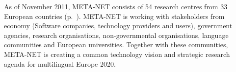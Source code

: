 \begin{Parallel}[c]{78mm}{78mm}
{As of November 2011, META-NET consists of 54 research centres from 33
European countries (p.~\pageref{metanetmembers}). META-NET is working
with stakeholders from economy (Software companies, technology
providers and users), government agencies, research organisations,
non-governmental organisations, language communities and European
universities. Together with these communities, META-NET is creating a
common technology vision and strategic research agenda for
multilingual Europe 2020.}
\ParallelPar
\end{Parallel}



\makefundingnotice

\cleardoublepage
{}
\renewcommand*\contentsname{}

\tableofcontents




\cleardoublepage

\setcounter{page}{1}
\pagestyle{scrheadings}


